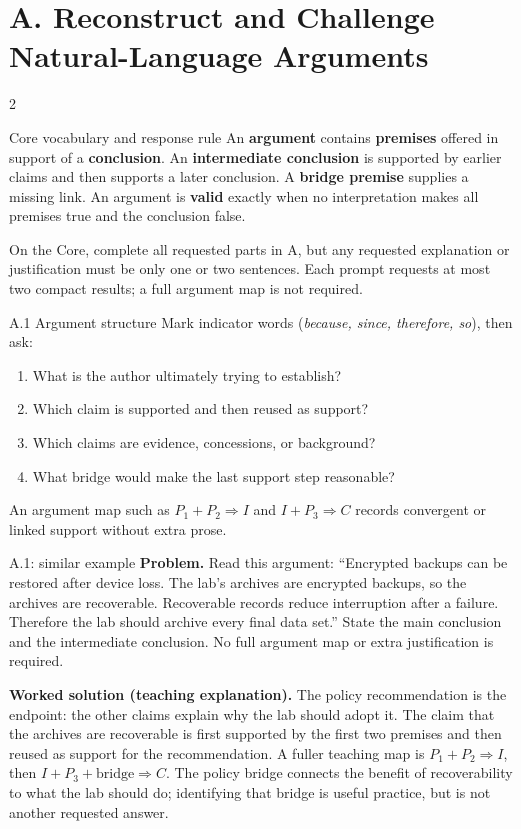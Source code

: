 \documentclass[10pt]{extarticle}
\newcommand{\term}[1]{\textbf{\color{ArgNavy}#1}}
\begin{document}
\small

\section*{A. Reconstruct and Challenge Natural-Language Arguments}
\begin{multicols}{2}
\begin{definitionbox}{Core vocabulary and response rule}
An \term{argument} contains \term{premises} offered in support of a
\term{conclusion}. An \term{intermediate conclusion} is supported by earlier
claims and then supports a later conclusion. A \term{bridge premise} supplies a
missing link. An argument is \term{valid} exactly when no interpretation makes
all premises true and the conclusion false.

On the Core, complete all requested parts in A, but any requested explanation
or justification must be only one or two sentences. Each prompt requests at
most two compact results; a full argument map is not required.
\end{definitionbox}

\begin{methodbox}{A.1 Argument structure}
Mark indicator words (\emph{because, since, therefore, so}), then ask:
\begin{enumerate}[label=\arabic*.]
  \item What is the author ultimately trying to establish?
  \item Which claim is supported and then reused as support?
  \item Which claims are evidence, concessions, or background?
  \item What bridge would make the last support step reasonable?
\end{enumerate}
An argument map such as $P_1+P_2\Rightarrow I$ and $I+P_3\Rightarrow C$
records convergent or linked support without extra prose.
\end{methodbox}

\begin{workedbox}{A.1: similar example}
\textbf{Problem.} Read this argument: ``Encrypted backups can be restored after device loss. The lab's archives are encrypted backups, so the archives are recoverable. Recoverable records reduce interruption after a failure. Therefore the lab should archive every final data set.'' State the main conclusion and the intermediate conclusion. No full argument map or extra justification is required.

\textbf{Worked solution (teaching explanation).} The policy recommendation is the endpoint: the other claims explain why the lab should adopt it. The claim that the archives are recoverable is first supported by the first two premises and then reused as support for the recommendation. A fuller teaching map is $P_1+P_2\Rightarrow I$, then $I+P_3+\text{bridge}\Rightarrow C$. The policy bridge connects the benefit of recoverability to what the lab should do; identifying that bridge is useful practice, but is not another requested answer.


\end{workedbox}
\end{multicols}
\end{document}
